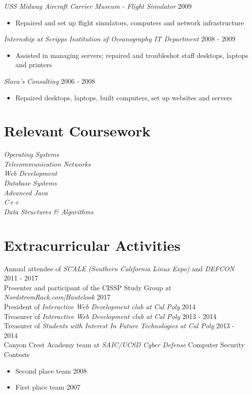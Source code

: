 \documentclass[line]{tex/res}
\begin{document}
\begin{resume}
	{\sl USS Midway Aircraft Carrier Museum - Flight Simulator} \hfill 2009
	\begin{itemize} \itemsep -2pt
		\item Repaired and set up flight simulators, computers and network infrastructure
	\end{itemize}

	{\sl Internship at Scripps Institution of Oceanography IT Department} \hfill 2008 - 2009
	\begin{itemize} \itemsep -2pt
		\item Assisted in managing servers; repaired and troubleshot staff desktops, laptops and printers
	\end{itemize}

	{\sl Slava's Consulting} \hfill 2006 - 2008
	\begin{itemize} \itemsep -2pt
		\item Repaired desktops, laptops, built computers, set up websites and servers
	\end{itemize}

\section{Relevant Coursework}
	{\sl Operating Systems } \\
	{\sl Telecommunication Networks } \\
	{\sl Web Development } \\
	{\sl Database Systems } \\
	{\sl Advanced Java} \\
	{\sl C++} \\
	{\sl Data Structures \& Algorithms}

\section{Extracurricular Activities}
    Annual attendee of {\it SCALE (Southern California Linux Expo)} and {\it DEFCON} \hfill 2011 - 2017 \\
    Presenter and participant of the CISSP Study Group at {\it NordstromRack.com|Hautelook} \hfill 2017 \\
	President of {\it Interactive Web Development club at Cal Poly} \hfill 2014 \\
	Treasurer of {\it Interactive Web Development club at Cal Poly} \hfill 2013 - 2014 \\
	Treasurer of {\it Students with Interest In Future Technologies at Cal Poly} \hfill 2013 - 2014 \\
	Canyon Crest Academy team at {\it SAIC/UCSD Cyber Defense} Computer Security Contests
	\begin{itemize} \itemsep -2pt
		\item Second place team \hfill 2008
		\item First place team \hfill 2007
	\end{itemize}

\end{resume}
\end{document}
